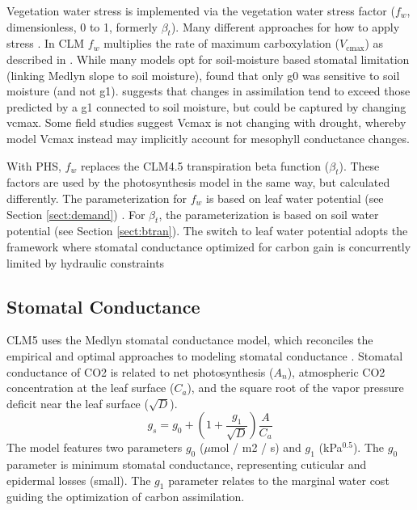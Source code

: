 \documentclass[draft,linenumbers]{agujournal}
\begin{document}
    Vegetation water stress is implemented via the vegetation water stress factor ($f_w$, dimensionless, 0 to 1, formerly $\beta_t$). 
    Many different approaches for how to apply stress \citep{zhou2013,novick2016a}.
    In CLM $f_w$ multiplies the rate of maximum carboxylation ($V_{\text{cmax}}$) as described in \citet{oleson2013}.
    While many models opt for soil-moisture based stomatal limitation (linking Medlyn slope to soil moisture),
    \cite{lin2018} found that only g0 was sensitive to soil moisture (and not g1).
    \cite{zhou2013} suggests that changes in assimilation tend to exceed those predicted by a g1 connected to soil moisture, but could be captured by changing vcmax.
    Some field studies suggest Vcmax is not changing with drought, whereby model Vcmax instead may implicitly account for mesophyll conductance changes.
    
    With PHS, $f_w$ replaces the CLM4.5 transpiration beta function ($\beta_t$). 
    These factors are used by the photosynthesis model in the same way, but calculated differently. 
    The parameterization for $f_w$ is based on leaf water potential (see Section \ref{sect:demand}) . 
    For $\beta_t$, the parameterization is based on soil water potential (see Section \ref{sect:btran}).
    The switch to leaf water potential adopts the framework where stomatal conductance optimized for carbon gain is concurrently limited by hydraulic constraints \citep{novick2016a}


\subsection{Stomatal Conductance}
\label{sect:gs}
    CLM5 uses the Medlyn stomatal conductance model, which reconciles the empirical and optimal approaches to modeling 
    stomatal conductance \citep{medlyn2011}. 
    Stomatal conductance of CO2 is related to net photosynthesis ($A_n$), atmospheric CO2 concentration at the leaf surface 
    ($C_a$), and the square root of the vapor pressure deficit near the leaf surface ($\sqrt{D}$).
    \begin{equation}
    g_s=g_0+\left(1+\dfrac{g_1}{\sqrt{D}}\right)\dfrac{A}{C_a}
    \end{equation}
    The model features two parameters $g_0$ ($\mu$mol / m2 / s) and $g_1$ (kPa$^{0.5}$). 
    The $g_0$ parameter is minimum stomatal conductance, representing cuticular and epidermal losses (small). 
    The $g_1$ parameter relates to the marginal water cost guiding the optimization of carbon assimilation.
    
\end{document}
